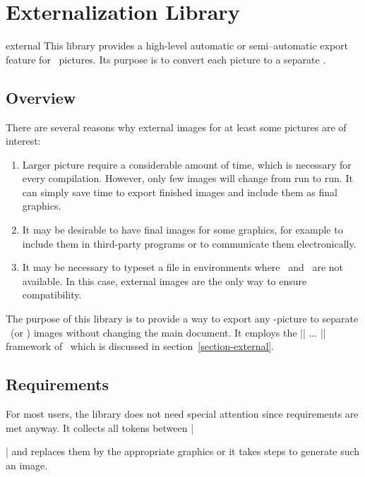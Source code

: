 %
%
%
\section{Externalization Library}
\label{section-libs-external}
{}

\begin{tikzlibrary}{external}
	This library provides a high-level automatic or semi--automatic export feature for \tikzname\ pictures.
	Its purpose is to convert each picture to a separate \pdf.
\end{tikzlibrary}

\subsection{Overview}

There are several reasons why external images for at least some pictures are of interest:
\begin{enumerate}
	\item Larger picture require a considerable amount of time, which is necessary for every compilation. However, only few images will change from run to run. It can simply save time to export finished images and include them as final graphics.
	\item It may be desirable to have final images for some graphics, for example to include them in third-party programs or to communicate them electronically.
	\item It may be necessary to typeset a file in environments where \pgfname\ and \tikzname\ are not available. In this case, external images are the only way to ensure compatibility.
\end{enumerate}
The purpose of this library is to provide a way to export any \tikzname-picture to separate \pdf\ (or \eps) images without changing the main document. It employs the |\beginpgfgraphicnamed| $\dotsc$ |\endpgfgraphicnamed| framework of \pgfname\ which is discussed in section~\ref{section-external}.

\subsection{Requirements}
For most users, the library does not need special attention since requirements are met anyway. It collects all tokens between || and replaces them by the appropriate graphics or it takes steps to generate such an image.%


